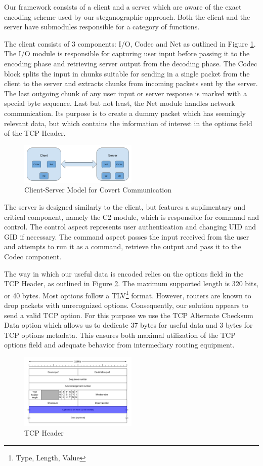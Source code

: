 
Our framework consists of a client and a server which are aware of the exact
encoding scheme used by our steganographic approach. Both the client and the
server have submodules responsible for a category of functions.

The client consists of 3 components: I/O, Codec and Net as outlined in Figure
\ref{fig:architecture}. The I/O module is responsible for capturing user input
before passing it to the encoding phase and retrieving server output from the
decoding phase. The Codec block splits the input in chunks suitable for sending
in a single packet from the client to the server and extracts chunks from
incoming packets sent by the server. The last outgoing chunk of any user input
or server response is marked with a special byte sequence. Last but not least,
the Net module handles network communication. Its purpose is to create a dummy
packet which has seemingly relevant data, but which contains the information of
interest in the options field of the TCP Header.

\begin{figure}
  \centering
  \includegraphics[width=0.5\textwidth]{img/client-server-architecture}
  \caption{Client-Server Model for Covert Communication}
  \label{fig:architecture}
\end{figure}

The server is designed similarly to the client, but features a suplimentary
and critical component, namely the C2 module, which is responsible for command
and control. The control aspect represents user authentication and changing
UID and GID if necessary. The command aspect passes the input received from the
user and attempts to run it as a command, retrieve the output and pass it to the
Codec component.

The way in which our useful data is encoded relies on the options field in the
TCP Header, as outlined in Figure \ref{fig:tcp-header}. The maximum supported
length is 320 bits, or 40 bytes. Most options follow a TLV\footnote{Type, Length, Value}
format. However, routers are known to drop packets with unrecognized options.
Consequently, our solution appears to send a valid TCP option. For this
purpose we use the TCP Alternate Checksum Data option which allows us to
dedicate 37 bytes for useful data and 3 bytes for TCP options metadata.
This ensures both maximal utilization of the TCP options field and adequate
behavior from intermediary routing equipment.

\begin{figure}
  \centering
  \includegraphics[width=0.5\textwidth]{img/tcp-header}
  \caption{TCP Header}
  \label{fig:tcp-header}
\end{figure}
